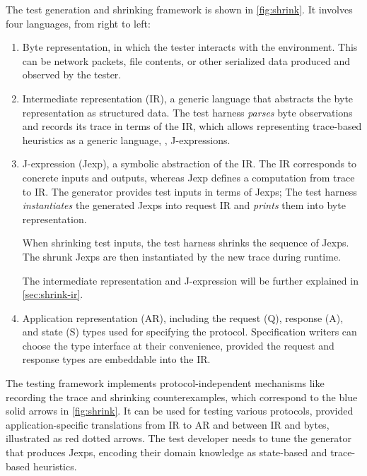 The test generation and shrinking framework is shown in \autoref{fig:shrink}.
It involves four languages, from right to left:
\begin{enumerate}
  \item Byte representation, in which the tester interacts with the environment.
    This can be network packets, file contents, or other serialized data
    produced and observed by the tester.

  \item Intermediate representation (IR), a generic language that abstracts the
    byte representation as structured data.  The test harness {\em parses} byte
    observations and records its trace in terms of the IR, which allows
    representing trace-based heuristics as a generic language, \ie,
    J-expressions.

  \item J-expression (Jexp), a symbolic abstraction of the IR.  The IR
    corresponds to concrete inputs and outputs, whereas Jexp defines a
    computation from trace to IR.  The generator provides test inputs in terms
    of Jexps; The test harness {\em instantiates} the generated Jexps into
    request IR and {\em prints} them into byte representation.

    When shrinking test inputs, the test harness shrinks the sequence of Jexps.
    The shrunk Jexps are then instantiated by the new trace during runtime.

    The intermediate representation and J-expression will be further explained
    in \autoref{sec:shrink-ir}.

  \item Application representation (AR), including the request (\ilc Q),
    response (\ilc A), and state (\ilc S) types used for specifying the
    protocol.  Specification writers can choose the type interface at their
    convenience, provided the request and response types are embeddable into the
    IR.
\end{enumerate}

The testing framework implements protocol-independent mechanisms like recording
the trace and shrinking counterexamples, which correspond to the blue solid
arrows in \autoref{fig:shrink}.  It can be used for testing various protocols,
provided application-specific translations from IR to AR and between IR and
bytes, illustrated as red dotted arrows.  The test developer needs to tune the
generator that produces Jexps, encoding their domain knowledge as state-based
and trace-based heuristics.

